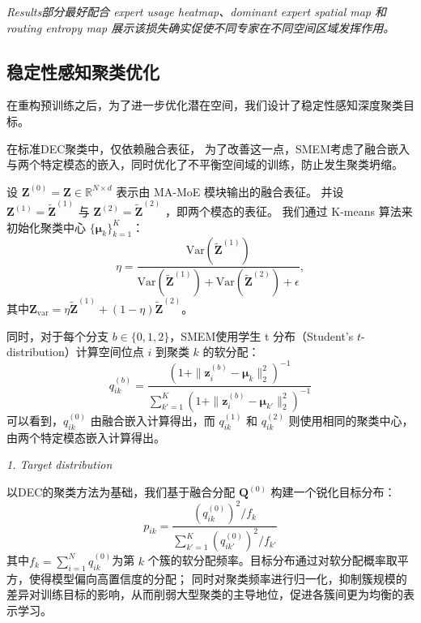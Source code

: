 \documentclass[journal]{IEEEtran}
\begin{document}
\textit{Results部分最好配合 expert usage heatmap、dominant expert spatial map 和 routing entropy map 展示该损失确实促使不同专家在不同空间区域发挥作用。}

\subsection{稳定性感知聚类优化}

在重构预训练之后，为了进一步优化潜在空间，我们设计了稳定性感知深度聚类目标。

在标准DEC聚类中，仅依赖融合表征，
为了改善这一点，SMEM考虑了融合嵌入与两个特定模态的嵌入，同时优化了不平衡空间域的训练，防止发生聚类坍缩。

设 $\mathbf{Z}^{(0)}=\mathbf{Z}\in\mathbb{R}^{N\times d}$ 表示由 MA-MoE 模块输出的融合表征。
并设 $\mathbf{Z}^{(1)}=\widetilde{\mathbf{Z}}^{(1)}$ 与 $\mathbf{Z}^{(2)}=\widetilde{\mathbf{Z}}^{(2)}$ ，即两个模态的表征。
我们通过 K-means 算法来初始化聚类中心 $\{\boldsymbol{\mu}_k\}_{k=1}^{K}$：
\begin{equation}
\eta=
\frac{\mathrm{Var}(\widetilde{\mathbf{Z}}^{(1)})}
{\mathrm{Var}(\widetilde{\mathbf{Z}}^{(1)})+
 \mathrm{Var}(\widetilde{\mathbf{Z}}^{(2)})+\epsilon},
\end{equation}
其中$\mathbf{Z}_{\mathrm{var}}=\eta \widetilde{\mathbf{Z}}^{(1)}+(1-\eta)\widetilde{\mathbf{Z}}^{(2)}$。

同时，对于每个分支 $b\in\{0,1,2\}$，SMEM使用学生 t 分布（Student's $t$-distribution）计算空间位点 $i$ 到聚类 $k$ 的软分配：
\begin{equation}
    q_{ik}^{(b)}
=
\frac{
\left(1+\|\mathbf{z}_{i}^{(b)}-\boldsymbol{\mu}_{k}\|_2^2\right)^{-1}
}{
\sum_{k'=1}^{K}
\left(1+\|\mathbf{z}_{i}^{(b)}-\boldsymbol{\mu}_{k'}\|_2^2\right)^{-1}
}
\end{equation}
可以看到，$q_{ik}^{(0)}$ 由融合嵌入计算得出，而 $q_{ik}^{(1)}$ 和 $q_{ik}^{(2)}$ 则使用相同的聚类中心，由两个特定模态嵌入计算得出。

\textit{1. Target distribution}

以DEC的聚类方法为基础，我们基于融合分配 $\mathbf{Q}^{(0)}$ 构建一个锐化目标分布：
\begin{equation}
    p_{ik}
=
\frac{
(q_{ik}^{(0)})^2 / f_k
}{
\sum_{k'=1}^{K}
(q_{ik'}^{(0)})^2 / f_{k'}
}
\end{equation}
其中$f_k=\sum_{i=1}^{N}q_{ik}^{(0)}$为第 $k$ 个簇的软分配频率。目标分布通过对软分配概率取平方，使得模型偏向高置信度的分配；
同时对聚类频率进行归一化，抑制簇规模的差异对训练目标的影响，从而削弱大型聚类的主导地位，促进各簇间更为均衡的表示学习。
\end{document}
